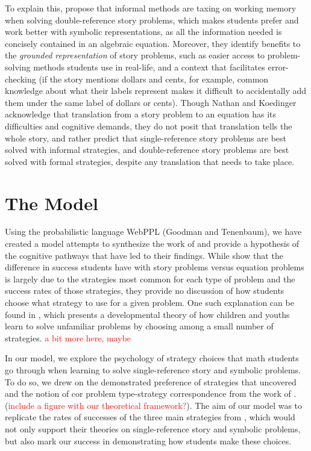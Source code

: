 \documentclass[10pt,letterpaper]{article}
\newcommand\TODO[1]{\textcolor{red}{#1}}
\begin{document}
To explain this,  propose that informal methods are taxing on working memory when solving double-reference story problems, which makes students prefer and work better with symbolic representations, as all the information needed is concisely contained in an algebraic equation. Moreover, they identify benefits to the \textit{grounded representation} of story problems, such as easier access to problem-solving methods students use in real-life, and a context that facilitates error-checking (if the story mentions dollars and cents, for example, common knowledge about what their labels represent makes it difficult to accidentally add them under the same label of dollars or cents). Though Nathan and Koedinger acknowledge that translation from a story problem to an equation has its difficulties and cognitive demands, they do not posit that translation tells the whole story, and rather predict that single-reference story problems are best solved with informal strategies, and double-reference story problems are best solved with formal strategies, despite any translation that needs to take place.


\section{The Model}



Using the probabilistic language WebPPL ({Goodman and Tenenbaum}), we have created a model attempts to synthesize the work of  and provide a hypothesis of the cognitive pathways that have led to their findings. %
While  show that the difference in success students have with story problems versus equation problems is largely due to the strategies most common for each type of problem and the success rates of those strategies, they provide no discussion of how students choose what strategy to use for a given problem. One such explanation can be found in \cite{Siegler}, which presents a developmental theory of how children and youths learn to solve unfamiliar problems by choosing among a small number of strategies. \TODO{a bit more here, maybe}

In our model, we explore the psychology of strategy choices that math students go through when learning to solve single-reference story and symbolic problems. To do so, we drew on the demonstrated preference of strategies that  uncovered and the notion of cor problem type-strategy correspondence from the work of . (\TODO{include a figure with our theoretical framework?}). The aim of our model was to replicate the rates of successes of the three main strategies from \cite{KoedNath2004}, which would not only support their theories on single-reference story and symbolic problems, but also mark our success in demonstrating how students make these choices.
\end{document}
